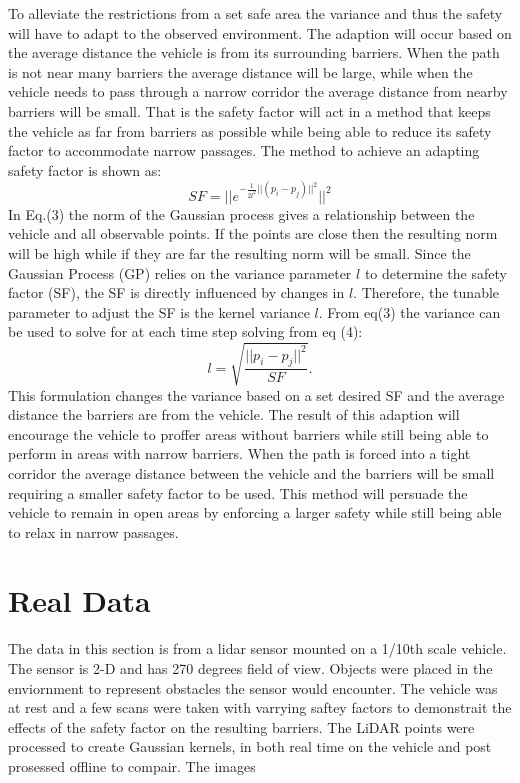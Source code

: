 \documentclass[conference]{IEEEtran}
\begin{document}
To alleviate the restrictions from a set safe area the variance and thus the safety will have to adapt to the observed environment. The adaption will occur based on the average distance the vehicle is from its surrounding barriers. When the path is not near many barriers the average distance will be large, while when the vehicle needs to pass through a narrow corridor the average distance from nearby barriers will be small. That is the safety factor will act in a method that keeps the vehicle as far from barriers as possible while being able to reduce its safety factor to accommodate narrow passages. 
The method to achieve an adapting safety factor is shown as:
\begin{equation}
SF = {||e^ {-\frac{1}{2l^2}||(p_i - p_j) ||^2}||^2} 
\end{equation}
In Eq.(3) the norm of the Gaussian process gives a relationship between the vehicle and all observable points. If the points are close then the resulting norm will be high while if they are far the resulting norm will be small. Since the Gaussian Process (GP) relies on the variance parameter $l$  to determine the safety factor (SF), the SF is directly influenced by changes in $l$. Therefore, the tunable parameter to adjust the SF is the kernel variance $l$. From eq(3) the variance can be used to solve for at each time step solving from eq (4):
\begin{equation}
l = \sqrt{\frac{|| p_i - p_j ||^2}{SF}}.
\end{equation}
This formulation changes the variance based on a set desired SF and the average distance the barriers are from the vehicle. The result of this adaption will encourage the vehicle to proffer areas without barriers while still being able to perform in areas with narrow barriers. When the path is forced into a tight corridor the average distance between the vehicle and the barriers will be small requiring a smaller safety factor to be used. This method will persuade the vehicle to remain in open areas by enforcing a larger safety while still being able to relax in narrow passages. 

\section{Real Data}
The data in this section is from a lidar sensor mounted on a 1/10th scale vehicle. The sensor is 2-D and has 270 degrees field of view. Objects were placed in the enviornment to represent obstacles the sensor would encounter. The vehicle was at rest and a few scans were taken with varrying saftey factors to demonstrait the effects of the safety factor on the resulting barriers. The LiDAR points were processed to create Gaussian kernels, in both real time on the vehicle and post prosessed offline to compair. 
The images 
\end{document}
